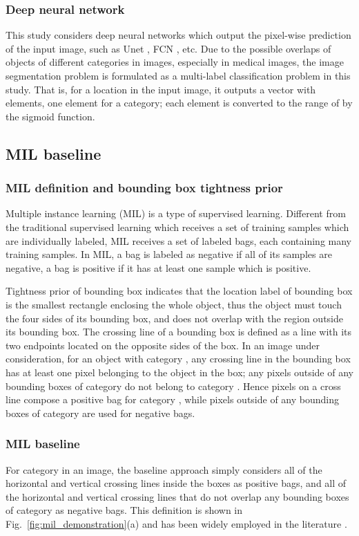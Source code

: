 \documentclass[runningheads]{llncs}
\begin{document}
\subsubsection{Deep neural network}
This study considers deep neural networks which output the pixel-wise prediction of the input image, such as Unet \cite{ronneberger2015u}, FCN \cite{long2015fully}, etc. Due to the possible overlaps of objects of different categories in images, especially in medical images, the image segmentation problem is formulated as a multi-label classification problem in this study. That is, for a location  in the input image, it outputs a vector  with  elements, one element for a category; each element is converted to the range of  by the sigmoid function.



\subsection{MIL baseline}

\subsubsection{MIL definition and bounding box tightness prior}
Multiple instance learning (MIL) is a type of supervised learning. Different from the traditional supervised learning which receives a set of training samples which are individually labeled, MIL receives a set of labeled bags, each containing many training samples. In MIL, a bag is labeled as negative if all of its samples are negative, a bag is positive if it has at least one sample which is positive. 

Tightness prior of bounding box indicates that the location label of bounding box is the smallest rectangle enclosing the whole object, thus the object must touch the four sides of its bounding box, and does not overlap with the region outside its bounding box. The crossing line of a bounding box is defined as a line with its two endpoints located on the opposite sides of the box. In an image  under consideration, for an object with category , any crossing line in the bounding box has at least one pixel belonging to the object in the box; any pixels outside of any bounding boxes of category  do not belong to category . Hence pixels on a cross line compose a positive bag for category , while pixels outside of any bounding boxes of category  are used for negative bags. 



\subsubsection{MIL baseline} 
\label{section:baseline_baseline}
For category  in an image, the baseline approach simply considers all of the horizontal and vertical crossing lines inside the boxes as positive bags, and all of the horizontal and vertical crossing lines that do not overlap any bounding boxes of category  as negative bags. This definition is shown in Fig.~\ref{fig:mil_demonstration}(a) and has been widely employed in the literature \cite{hsu2019weakly,kervadec2020bounding}.
\end{document}
